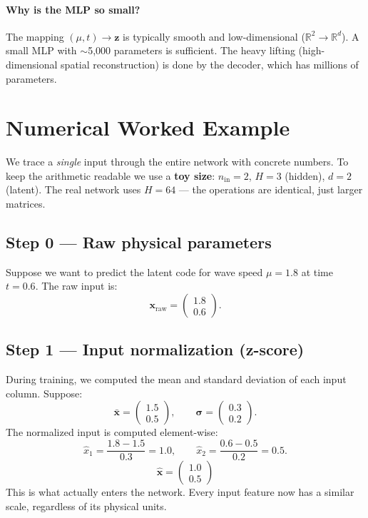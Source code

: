 \documentclass[11pt,a4paper]{article}
\newcommand{\R}{\mathbb{R}}
\newcommand{\bz}{\mathbf{z}}
\newcommand{\bx}{\mathbf{x}}
\begin{document}
\paragraph{Why is the MLP so small?}
The mapping $(\mu, t) \to \bz$ is typically smooth and low-dimensional
($\R^2 \to \R^d$).  A small MLP with $\sim$5{,}000 parameters is
sufficient.  The heavy lifting (high-dimensional spatial reconstruction)
is done by the decoder, which has millions of parameters.

\section{Numerical Worked Example}
\label{sec:example}

We trace a \emph{single} input through the entire network with concrete
numbers. To keep the arithmetic readable we use a \textbf{toy size}:
$n_{\mathrm{in}}=2$, $H=3$ (hidden), $d=2$ (latent).
The real network uses $H=64$ --- the operations are identical, just
larger matrices.

\subsection{Step 0 --- Raw physical parameters}

Suppose we want to predict the latent code for wave speed
$\mu = 1.8$ at time $t = 0.6$.  The raw input is:
\[
  \bx_{\text{raw}} = \begin{pmatrix} 1.8 \\ 0.6 \end{pmatrix}.
\]

\subsection{Step 1 --- Input normalization (z-score)}

During training, we computed the mean and standard deviation of each
input column.  Suppose:
\[
  \bar{\bx} = \begin{pmatrix} 1.5 \\ 0.5 \end{pmatrix},
  \qquad
  \boldsymbol{\sigma} = \begin{pmatrix} 0.3 \\ 0.2 \end{pmatrix}.
\]
The normalized input is computed element-wise:
\[
  \hat{x}_1 = \frac{1.8 - 1.5}{0.3} = 1.0,
  \qquad
  \hat{x}_2 = \frac{0.6 - 0.5}{0.2} = 0.5.
\]
\[
  \boxed{\hat{\bx} = \begin{pmatrix} 1.0 \\ 0.5 \end{pmatrix}}
\]
This is what actually enters the network.  Every input feature now has
a similar scale, regardless of its physical units.
\end{document}
